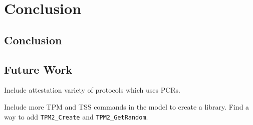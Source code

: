 \chapter{Conclusion}



\section{Conclusion}

\section{Future Work}
Include attestation variety of protocols which uses PCRs.

Include more TPM and TSS commands in the model to create a library. Find a way to add \verb|TPM2_Create| and \verb|TPM2_GetRandom|.


